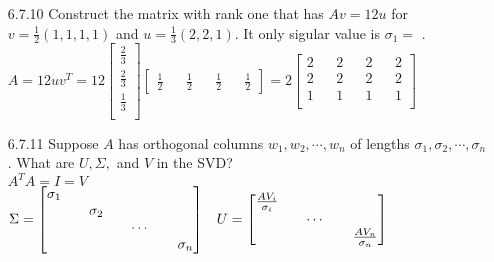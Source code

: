 \documentclass[10pt,twoside,reqno]{article}
\begin{document}
\begin{enumerate}
\item[6.7.10] Construct the matrix with rank one that has $Av = 12u$ for $v = \frac{1}{2}(1, 1, 1, 1)$ and $u = \frac{1}{3}(2, 2, 1)$. It only sigular value is $\sigma_1 = $ \underline{\hspace{7mm}}.\\
$
$$
A =
12uv^T = 12
\begin{bmatrix}
\frac{2}{3}\\
\frac{2}{3}\\
\frac{1}{3}\\
\end{bmatrix}
\begin{bmatrix}
\frac{1}{2} && \frac{1}{2} && \frac{1}{2} && \frac{1}{2}
\end{bmatrix}
=
2
\begin{bmatrix}
2 && 2 && 2 && 2\\
2 && 2 && 2 && 2\\
1 && 1 && 1 && 1\\
\end{bmatrix}
$$
$

\vspace{3mm}
\item[6.7.11] Suppose $A$ has orthogonal columns $w_1, w_2, \cdots , w_n$ of lengths $\sigma_1, \sigma_2, \cdots, \sigma_n$. What are $U, \Sigma,$ and $V$ in the SVD?\\
$A^TA = I = V$\\
$
$$
\Sigma =
\begin{bmatrix}
\sigma_1 && && && \\
 && \sigma_2 &&  &&\\
 && && \cdots && \\
 && && && \sigma_n\\
\end{bmatrix}
\hspace{3mm}
U =
\begin{bmatrix}
\frac{AV_i}{\sigma_i} && &&\\
&& \cdots &&\\
&& && \frac{AV_n}{\sigma_n}\\
\end{bmatrix}
$$
$\\

\vspace{3mm}
\end{enumerate}
\end{document}
